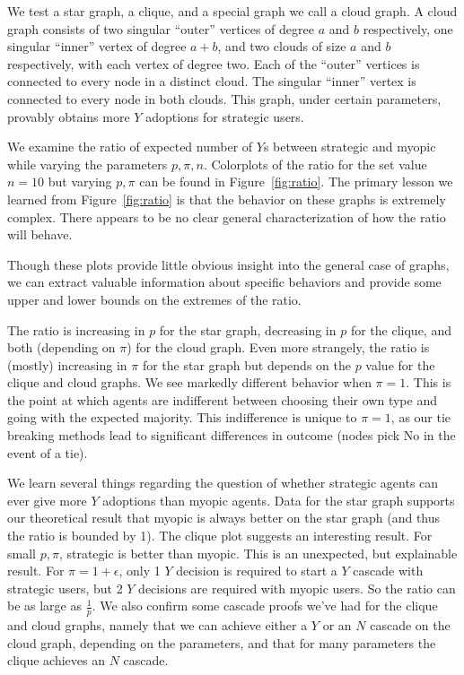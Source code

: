 \documentclass{article}
\begin{document}
We test a star graph, a clique, and a special graph we call a cloud
graph. A cloud graph consists of two singular ``outer'' vertices of
degree $a$ and $b$ respectively, one singular ``inner'' vertex of
degree $a+b$, and two clouds of size $a$ and $b$ respectively, with
each vertex of degree two. Each of the ``outer'' vertices is connected
to every node in a distinct cloud. The singular ``inner'' vertex is
connected to every node in both clouds. This graph, under certain
parameters, provably obtains more $Y$ adoptions for strategic users.

We examine the ratio of expected number of $Y$s between strategic and
myopic while varying the parameters $p, \pi, n$. Colorplots of the
ratio for the set value $n=10$ but varying $p, \pi$ can be found in
Figure~\ref{fig:ratio}. The primary lesson we learned from
Figure~\ref{fig:ratio} is that the behavior on these graphs is
extremely complex. There appears to be no clear general
characterization of how the ratio will behave.

Though these plots provide little obvious insight into the general
case of graphs, we can extract valuable information about specific
behaviors and provide some upper and lower bounds on the extremes of
the ratio.

The ratio is increasing in $p$ for the star graph, decreasing in $p$
for the clique, and both (depending on $\pi$) for the cloud
graph. Even more strangely, the ratio is (mostly) increasing in $\pi$
for the star graph but depends on the $p$ value for the clique and
cloud graphs. We see markedly different behavior when $\pi = 1$. This
is the point at which agents are indifferent between choosing their
own type and going with the expected majority. This indifference is
unique to $\pi=1$, as our tie breaking methods lead to significant
differences in outcome (nodes pick No in the event of a tie).

We learn several things regarding the question of whether strategic
agents can ever give more $Y$ adoptions than myopic agents. Data for
the star graph supports our theoretical result that myopic is always
better on the star graph (and thus the ratio is bounded by 1). The
clique plot suggests an interesting result. For small $p, \pi$,
strategic is better than myopic. This is an unexpected, but
explainable result. For $\pi=1+\epsilon$, only 1 $Y$ decision is
required to start a $Y$ cascade with strategic users, but 2 $Y$ decisions
are required with myopic users. So the ratio can be as large as
$\frac{1}{p}$. We also confirm some cascade proofs we've had for the
clique and cloud graphs, namely that we can achieve either a $Y$ or an
$N$ cascade on the cloud graph, depending on the parameters, and that
for many parameters the clique achieves an $N$ cascade.
\end{document}
